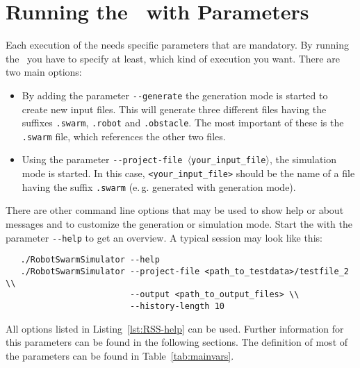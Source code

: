 \section{Running the \RSS\ with Parameters}
Each execution of the \RSS needs specific parameters that are mandatory. By running the \RSS\ you have to specify at least, which kind of execution you want. There are two main options:

\begin{itemize}
	\item By adding the parameter {\tt -{}-generate} the generation mode is started to create new input files. This will generate three different files having the suffixes {\tt .swarm}, {\tt .robot} and {\tt .obstacle}. The most important of these is the {\tt .swarm} file, which references the other two files.
	\item Using the parameter {\tt -{}-project-file $\langle$your\_input\_file$\rangle$}, the simulation mode is started. In this case, \texttt{<your\_input\_file>} should be the name of a file having the suffix {\tt .swarm} (e.\,g. generated with generation mode).
\end{itemize}

There are other command line options that may be used to show help or about messages and to customize the generation or simulation mode. Start the \RSS with the parameter {\tt -{}-help} to get an overview. A typical session may look like this:

\begin{verbatim}
   ./RobotSwarmSimulator --help
   ./RobotSwarmSimulator --project-file <path_to_testdata>/testfile_2 \\
                         --output <path_to_output_files> \\
                         --history-length 10
\end{verbatim}

All options listed in Listing~\ref{lst:RSS-help} can be used. Further information for this parameters can be found in the following sections. The definition of most of the parameters can be found in Table~\ref{tab:mainvars}.

